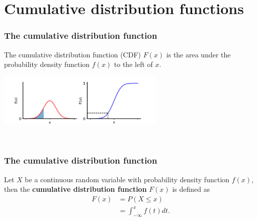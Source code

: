 \documentclass[9pt]{beamer}
\begin{document}
\section{Cumulative distribution functions}
\begin{frame}
\frametitle{The cumulative distribution function}

The cumulative distribution function (CDF) $F(x)$ is the area under the probability density function $f(x)$ to the left of $x$.

\begin{center}
\includegraphics[height=2.5cm]{images/pdf_cdf_1.png}
\end{center}


\


\end{frame}

\begin{frame}
\frametitle{The cumulative distribution function}


\vspace{.3cm}

\begin{definition} 
Let $X$ be a continuous random variable with probability density function $f(x)$, then the \textbf{cumulative distribution function} $F(x)$ is defined as
\begin{align*}
F(x) &= P(X \leq x)\\
&= \int_{-\infty}^x f(t) dt.
\end{align*} 
\end{definition}

\vspace{0.5cm}


\end{frame}
\end{document}
